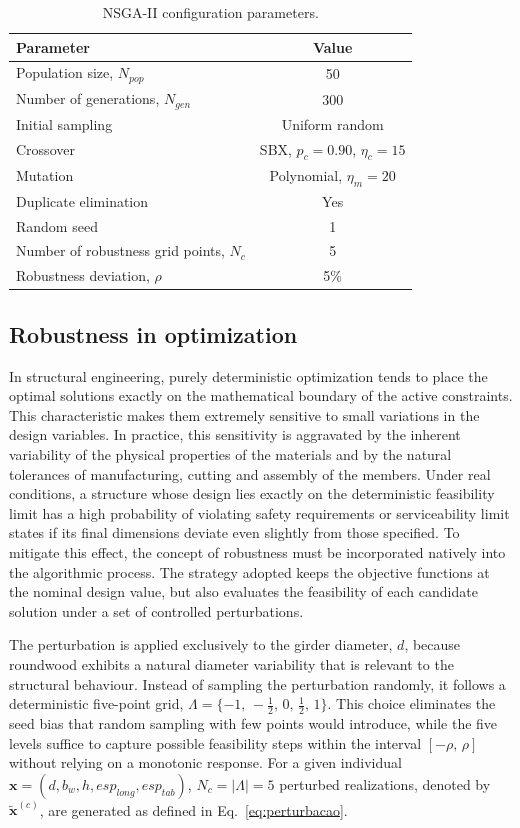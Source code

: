\begin{table}[!ht]
\caption{NSGA-II configuration parameters.\label{tab:nsga2}}
\begin{tabular*}{\columnwidth}{@{\extracolsep\fill}lc@{\extracolsep\fill}}
\toprule
Parameter & Value \\
\midrule
Population size, $N_{pop}$ & 50 \\
Number of generations, $N_{gen}$ & 300 \\
Initial sampling & Uniform random \\
Crossover & SBX, $p_c = 0.90$, $\eta_c = 15$ \\
Mutation & Polynomial, $\eta_m = 20$ \\
Duplicate elimination & Yes \\
Random seed & 1 \\
Number of robustness grid points, $N_c$ & 5 \\
Robustness deviation, $\rho$ & 5\% \\
\bottomrule
\end{tabular*}
\end{table}

 \subsection{Robustness in optimization}\label{sec:robustez}

In structural engineering, purely deterministic optimization tends to place the optimal solutions exactly on the mathematical boundary of the active constraints.
This characteristic makes them extremely sensitive to small variations in the design variables.
In practice, this sensitivity is aggravated by the inherent variability of the physical properties of the materials and by the natural tolerances of manufacturing, cutting and assembly of the members.
Under real conditions, a structure whose design lies exactly on the deterministic feasibility limit has a high probability of violating safety requirements or serviceability limit states if its final dimensions deviate even slightly from those specified.
To mitigate this effect, the concept of robustness must be incorporated natively into the algorithmic process.
The strategy adopted keeps the objective functions at the nominal design value, but also evaluates the feasibility of each candidate solution under a set of controlled perturbations.

The perturbation is applied exclusively to the girder diameter, $d$, because roundwood exhibits a natural diameter variability that is relevant to the structural behaviour. Instead of sampling the perturbation randomly, it follows a deterministic five-point grid, $\Lambda = \{-1,\,-\tfrac{1}{2},\,0,\,\tfrac{1}{2},\,1\}$. This choice eliminates the seed bias that random sampling with few points would introduce, while the five levels suffice to capture possible feasibility steps within the interval $[-\rho,\,\rho]$ without relying on a monotonic response.
For a given individual $\mathbf{x} = (d,\allowbreak b_w,\allowbreak h,\allowbreak esp_{long},\allowbreak esp_{tab})$, $N_c = |\Lambda| = 5$ perturbed realizations, denoted by $\tilde{\mathbf{x}}^{(c)}$, are generated as defined in Eq.~\eqref{eq:perturbacao}.

